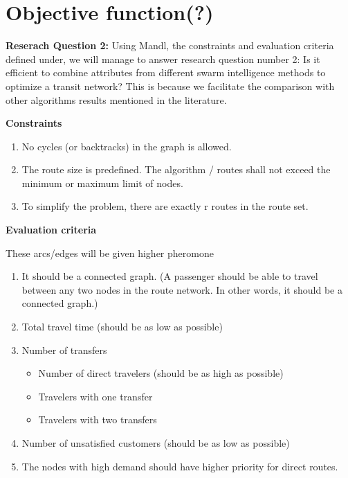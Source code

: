 \section{Objective function(?)}
\textbf{Reserach Question 2: }
Using Mandl, the constraints and evaluation criteria defined under, we will manage to answer research question number 2: Is it efficient to combine attributes from different swarm intelligence methods to optimize a transit network? This is because we facilitate the comparison with other algorithms results mentioned in the literature. 

\textbf{Constraints}
\begin{enumerate}
\item \label{itm:constraintCycles} No cycles (or backtracks) in the graph is allowed.
\item \label{itm:constraintRouteSize} The route size is predefined. The algorithm / routes shall not exceed the minimum or maximum limit of nodes.
\item \label{itm:constraintRouteSet} To simplify the problem, there are exactly r routes in the route set.
\end{enumerate}

\textbf{Evaluation criteria}
\par
These arcs/edges will be given higher pheromone
\begin{enumerate}
\item \label{itm:criteriaConnectedGraph} It should be a connected graph. (A passenger should be able to travel between any two nodes in the route network. In other words, it should be a connected graph.) 
\item \label{itm:criteriaTotalTravelTime} Total travel time (should be as low as possible)
\item \label{itm:TODO} Number of transfers
\begin{itemize}
\item Number of direct travelers (should be as high as possible)
\item Travelers with one transfer
\item Travelers with two transfers
\end{itemize}
\item \label{itm:TODO} Number of unsatisfied customers (should be as low as possible)
\item \label{itm:TODO} The nodes with high demand should have higher priority for direct routes.
\end{enumerate}

